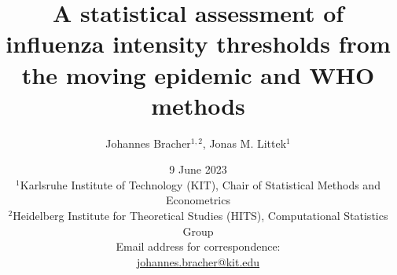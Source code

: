 \documentclass[12pt]{article}
\begin{document}

\title{A statistical assessment of influenza intensity thresholds from the moving epidemic and WHO methods}
\author{Johannes Bracher$^{1, 2}$, Jonas M. Littek$^1$}
\date{9 June 2023\\ \medskip \small
$^1$Karlsruhe Institute of Technology (KIT), Chair of Statistical Methods and Econometrics\\
$^2$Heidelberg Institute for Theoretical Studies (HITS), Computational Statistics Group\\ \medskip
Email address for correspondence:\\ \url{johannes.bracher@kit.edu}\\ %
}

\maketitle


\end{document}
